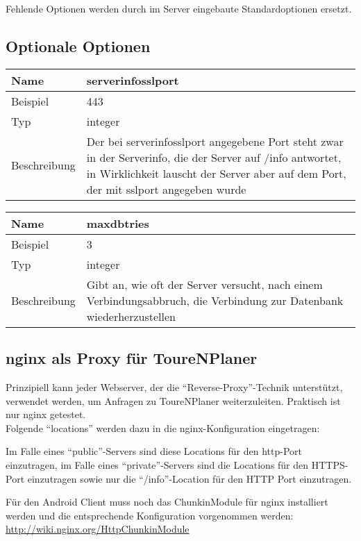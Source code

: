 \documentclass[ngerman,titlepage,parskip=true]{scrartcl}
\newcommand{\configoption}[4]
{%
\setlength{\extrarowheight}{2pt}
\begin{tabular}{|p{0.2\textwidth}|p{0.9\textwidth}|}
\hline
  \textbf{Name} & \textbf{#1}\\\hline
  Beispiel & #2\\\hline
  Typ & #3\\\hline
  Beschreibung & #4\\\hline
\end{tabular}
}
\begin{document}
Fehlende Optionen werden durch im Server eingebaute Standardoptionen ersetzt.

\subsection{Optionale Optionen}

\configoption
{serverinfosslport}
{443}
{integer}
{Der bei serverinfosslport angegebene Port steht zwar in der Serverinfo, die der Server auf /info antwortet, in Wirklichkeit lauscht der Server aber auf dem Port, der mit sslport angegeben wurde}

\configoption
{maxdbtries}
{3}
{integer}
{Gibt an, wie oft der Server versucht, nach einem Verbindungsabbruch, die Verbindung zur Datenbank wiederherzustellen}

\subsection{nginx als Proxy f\"ur ToureNPlaner}

Prinzipiell kann jeder Webserver, der die ``Reverse-Proxy''-Technik unterst\"utzt, verwendet werden, um Anfragen zu ToureNPlaner weiterzuleiten. Praktisch ist nur nginx getestet.\\

Folgende ``locations'' werden dazu in die nginx-Konfiguration eingetragen:

Im Falle eines ``public''-Servers sind diese Locations f\"ur den http-Port einzutragen, im Falle eines ``private''-Servers sind die Locations f\"ur den HTTPS-Port einzutragen sowie nur die ``/info''-Location f\"ur den HTTP Port einzutragen.

F\"ur den Android Client muss noch das ChunkinModule f\"ur nginx installiert werden und die entsprechende Konfiguration vorgenommen werden:
\url{http://wiki.nginx.org/HttpChunkinModule}
\end{document}
